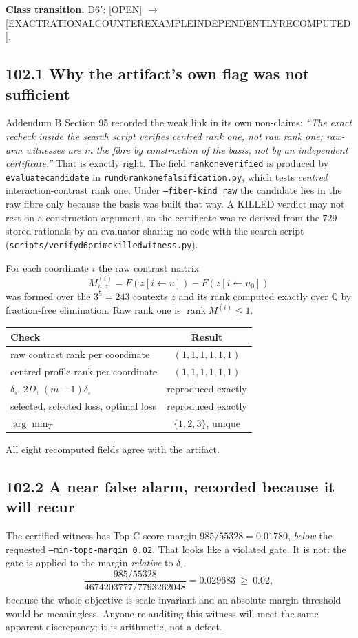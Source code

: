 \documentclass[9pt,twocolumn]{article}
\newcommand{\eclass}[1]{\textsf{[#1]}}
\renewcommand{\_}{\CIGunderscore\allowbreak}
\begin{document}
\textbf{Class transition.} D6$'$: \eclass{OPEN} $\longrightarrow$ \eclass{EXACT\_RATIONAL\_COUNTEREXAMPLE\_INDEPENDENTLY\_RECOMPUTED}.

\subsection*{102.1 Why the artifact's own flag was not sufficient}
Addendum B Section 95 recorded the weak link in its own non-claims: \emph{``The exact recheck inside the search script verifies centred rank one, not raw rank one; raw-arm witnesses are in the fibre by construction of the basis, not by an independent certificate.''} That is exactly right. The field \texttt{rank\_one\_verified} is produced by \texttt{evaluate\_candidate} in \texttt{run\_d6\_rankone\_falsification.py}, which tests \emph{centred} interaction-contrast rank one. Under \texttt{--fiber-kind raw} the candidate lies in the raw fibre only because the basis was built that way. A KILLED verdict may not rest on a construction argument, so the certificate was re-derived from the $729$ stored rationals by an evaluator sharing no code with the search script (\texttt{scripts/verify\_d6prime\_killed\_witness.py}).

For each coordinate $i$ the raw contrast matrix
\[
M^{(i)}_{u,z}=F(z[i\!\leftarrow\!u])-F(z[i\!\leftarrow\!u_0])
\]
was formed over the $3^5=243$ contexts $z$ and its rank computed exactly over $\mathbb{Q}$ by fraction-free elimination. Raw rank one is $\operatorname{rank}M^{(i)}\le1$.
\begin{center}\scriptsize
\begin{tabularx}{0.98\columnwidth}{Xc}
\toprule
Check & Result\\
\midrule
raw contrast rank per coordinate & $(1,1,1,1,1,1)$\\
centred profile rank per coordinate & $(1,1,1,1,1,1)$\\
$\delta_{\square}$, $2D$, $(m-1)\delta_\square$ & reproduced exactly\\
selected, selected loss, optimal loss & reproduced exactly\\
$\arg\min_T$ & $\{1,2,3\}$, unique\\
\bottomrule
\end{tabularx}
\end{center}
All eight recomputed fields agree with the artifact.

\subsection*{102.2 A near false alarm, recorded because it will recur}
The certified witness has Top-C score margin $985/55328=0.01780$, \emph{below} the requested \texttt{--min-topc-margin 0.02}. That looks like a violated gate. It is not: the gate is applied to the margin \emph{relative} to $\delta_{\square}$,
\[
\frac{985/55328}{4674203777/7793262048}=0.029683\ \ge\ 0.02 ,
\]
because the whole objective is scale invariant and an absolute margin threshold would be meaningless. Anyone re-auditing this witness will meet the same apparent discrepancy; it is arithmetic, not a defect.
\end{document}
